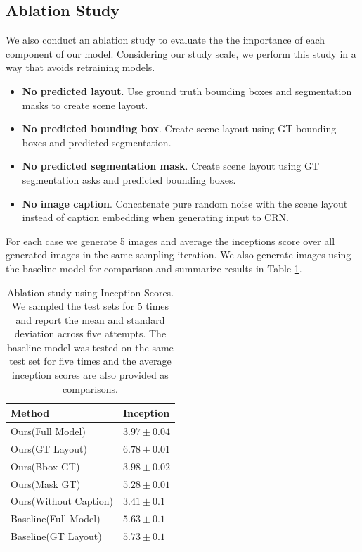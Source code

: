 \documentclass{article}
\begin{document}
\subsection{Ablation Study}
We also conduct an ablation study to evaluate the the importance of each component of our model. Considering our study scale, we perform this study in a way that avoids retraining models.
 \begin{itemize}
   \item \textbf{No predicted layout}. Use ground truth bounding boxes and segmentation masks to create scene layout.
   \item \textbf{No predicted bounding box}. Create scene layout using GT bounding boxes and predicted segmentation.
   \item \textbf{No predicted segmentation mask}. Create scene layout using GT segmentation asks and predicted bounding boxes.
   \item \textbf{No image caption}. Concatenate pure random noise with the scene layout instead of caption embedding when generating input to CRN.
 \end{itemize}
For each case we generate 5 images and average the inceptions score over all generated images in the same sampling iteration. We also generate images using the baseline model for comparison and summarize results in Table \ref{Ablation Study}.
\begin{table}[H]
    \centering
    \begin{tabular}{|l|l|}
    \hline
    Method                & Inception          \\ \hline
    Ours(Full Model)      & $3.97 \pm 0.04$          \\
    Ours(GT Layout)       & \textbf{$6.78\pm0.01$} \\
    Ours(Bbox GT)         & $3.98\pm0.02$          \\
    Ours(Mask GT)         & $5.28\pm0.01$          \\
    Ours(Without Caption) & $3.41\pm0.1 $          \\ \hline
    Baseline(Full Model)  & $5.63\pm0.1 $          \\
    Baseline(GT Layout)   & $5.73\pm0.1$           \\ \hline
    \end{tabular}
    \caption{Ablation study using Inception Scores. We sampled the test sets for 5 times and report the mean and standard deviation across five attempts. The baseline model was tested on the same test set for five times and the average inception scores are also provided as comparisons.}
    \label{Ablation Study}
\end{table}
\end{document}
